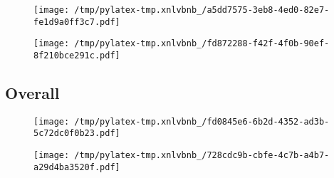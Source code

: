 \documentclass{article}%
\begin{document}
\begin{figure}[htbp]%
\centering%
\texttt{[image: /tmp/pylatex-tmp.xnlvbnb\_/a5dd7575-3eb8-4ed0-82e7-fe1d9a0ff3c7.pdf]}%
\end{figure}

%


\begin{figure}[htbp]%
\centering%
\texttt{[image: /tmp/pylatex-tmp.xnlvbnb\_/fd872288-f42f-4f0b-90ef-8f210bce291c.pdf]}%
\end{figure}

%
\newpage %
\subsection{Overall}%
\label{subsec:Overall}%


\begin{figure}[htbp]%
\centering%
\texttt{[image: /tmp/pylatex-tmp.xnlvbnb\_/fd0845e6-6b2d-4352-ad3b-5c72dc0f0b23.pdf]}%
\end{figure}

%


\begin{figure}[htbp]%
\centering%
\texttt{[image: /tmp/pylatex-tmp.xnlvbnb\_/728cdc9b-cbfe-4c7b-a4b7-a29d4ba3520f.pdf]}%
\end{figure}

%
\end{document}
